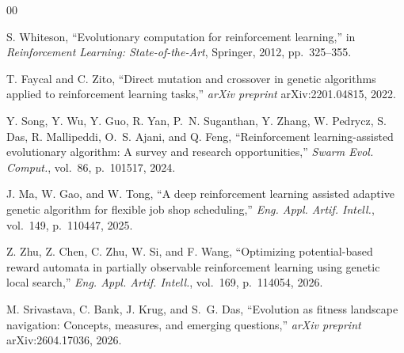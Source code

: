 \documentclass[conference]{IEEEtran}
\begin{document}
\begin{thebibliography}{00}

S. Whiteson, ``Evolutionary computation for reinforcement
learning,'' in \textit{Reinforcement Learning: State-of-the-Art},
Springer, 2012, pp.~325--355.

T. Faycal and C. Zito, ``Direct mutation and crossover in
genetic algorithms applied to reinforcement learning tasks,''
\textit{arXiv preprint} arXiv:2201.04815, 2022.

Y. Song, Y. Wu, Y. Guo, R. Yan, P.~N. Suganthan, Y. Zhang,
W. Pedrycz, S. Das, R. Mallipeddi, O.~S. Ajani, and Q. Feng,
``Reinforcement learning-assisted evolutionary algorithm:
A survey and research opportunities,''
\textit{Swarm Evol. Comput.}, vol.~86, p.~101517, 2024.

J. Ma, W. Gao, and W. Tong, ``A deep reinforcement learning
assisted adaptive genetic algorithm for flexible job shop
scheduling,'' \textit{Eng. Appl. Artif. Intell.}, vol.~149,
p.~110447, 2025.

Z. Zhu, Z. Chen, C. Zhu, W. Si, and F. Wang, ``Optimizing
potential-based reward automata in partially observable
reinforcement learning using genetic local search,''
\textit{Eng. Appl. Artif. Intell.}, vol.~169, p.~114054, 2026.

M. Srivastava, C. Bank, J. Krug, and S.~G. Das, ``Evolution
as fitness landscape navigation: Concepts, measures, and
emerging questions,'' \textit{arXiv preprint}
arXiv:2604.17036, 2026.

\end{thebibliography}
\end{document}
